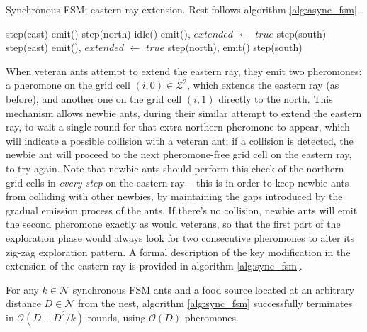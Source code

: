 \begin{algorithm}
  \caption{Synchronous FSM; eastern ray extension. Rest follows algorithm \ref{alg:async_fsm}.}
  \label{alg:sync_fsm}
  \begin{algorithmic}[1]
     
      \State step(east)
       emit() \EndIIf {}
      \State step(north) 
      \State idle() 
       emit(), $extended$ $\leftarrow$ $true$ \EndIIf
      \State step(south) 
    \Else {}
      \State step(east)
        \State emit(), $extended$ $\leftarrow$ $true$
        \State step(north), emit()
        \State step(south)
      \EndIf
    \EndIf
  \EndWhile
  \end{algorithmic}
\end{algorithm}

When veteran ants attempt to extend the eastern ray, they emit two
pheromones: a pheromone on the grid cell $(i, 0) \in \mathcal{Z}^2$, which extends the eastern ray
 (as before), and another one on the grid cell $(i, 1)$ directly to the north. 
This mechanism allows newbie ants, during their similar attempt to extend the eastern ray, to wait a
 single round for that extra northern pheromone to appear, which will indicate a possible collision
 with a veteran ant;
if a collision is detected, the newbie ant will proceed to the next pheromone-free
grid cell on the eastern ray, to try again. Note that newbie ants should perform this check
of the northern grid cells in \emph{every step} on the eastern ray --
this is in order to keep newbie ants from colliding with other newbies, by maintaining the gaps introduced by the gradual
emission process of the ants.
 If there's no collision, newbie ants will emit the second pheromone exactly as would
veterans, so that the first part of the exploration phase would always look for two consecutive pheromones
to alter its zig-zag exploration pattern.
A formal description of the key modification in the extension of the eastern ray is provided in algorithm \ref{alg:sync_fsm}.

\begin{theorem}
\label{thm:sync_fsm}
For any $k \in \mathcal{N}$ synchronous FSM ants and a food
 source located at an arbitrary distance $D \in \mathcal{N}$ from the nest, 
 algorithm \ref{alg:sync_fsm} successfully terminates in $\mathcal{O}(D + D^2/k)$
rounds, using $\mathcal{O}(D)$ pheromones.
\end{theorem}

